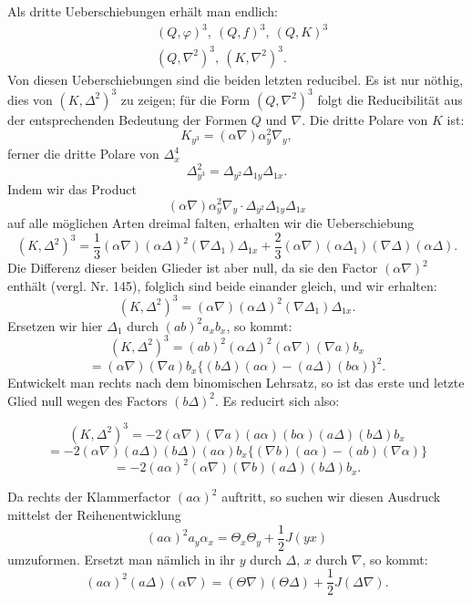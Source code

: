 Als dritte Ueberschiebungen erhält man endlich:
\[
\begin{aligned}
&(Q,\varphi)^3, \ (Q,f)^3, \ (Q,K)^3\\
&(Q,\nabla^2)^3, \ (K,\nabla^2)^3.
\end{aligned}
\]
Von diesen Ueberschiebungen sind die beiden letzten reducibel. Es ist nur
nöthig, dies von $(K,\Delta^2)^3$ zu zeigen; für die Form $(Q,\nabla^2)^3$
folgt die Reducibilität aus der entsprechenden Bedeutung der Formen $Q$
und $\nabla$. Die dritte Polare von $K$ ist:
\[
K_{y^3} = (\alpha\nabla)\alpha_y^2\nabla_y,
\]
ferner die dritte Polare von $\Delta_x^4$
\[
\Delta_{y^3}^2 = \Delta_{y^2}\Delta_{1y}\Delta_{1x}.
\]
Indem wir das Product
\[
(\alpha\nabla)\alpha_y^2\nabla_y\cdot \Delta_{y^2}\Delta_{1y}\Delta_{1x}
\]
auf alle möglichen Arten dreimal falten, erhalten wir die Ueberschiebung
\[
(K,\Delta^2)^3 = \frac{1}{3}(\alpha\nabla)(\alpha\Delta)^2(\nabla\Delta_1)\Delta_{1x} + \frac{2}{3}(\alpha\nabla)(\alpha\Delta_1)(\nabla\Delta)(\alpha\Delta).
\]
Die Differenz dieser beiden Glieder ist aber null, da sie den Factor
$(\alpha\nabla)^2$ enthält (vergl. Nr. 145), folglich sind beide einander
gleich, und wir erhalten:
\[
(K,\Delta^2)^3 = (\alpha\nabla)(\alpha\Delta)^2(\nabla\Delta_1)\Delta_{1x}.
\]
Ersetzen wir hier $\Delta_1$ durch $(ab)^2a_xb_x$, so kommt:
\[
(K,\Delta^2)^3 = (ab)^2(\alpha\Delta)^2(\alpha\nabla)(\nabla a)b_x
\]
\[
= (\alpha\nabla)(\nabla a)b_x\{(b\Delta)(a\alpha) - (a\Delta)(b\alpha)\}^2.
\]
Entwickelt man rechts nach dem binomischen Lehrsatz, so ist das erste und
letzte Glied null wegen des Factors $(b\Delta)^2$. Es reducirt sich also:



\[
(K, \Delta^2)^3 = -2(\alpha\nabla)(\nabla a)(a\alpha)(b\alpha)(a\Delta)(b\Delta)b_x
\]
\[
= -2(\alpha\nabla)(a\Delta)(b\Delta)(a\alpha)b_x\{(\nabla b)(a\alpha)-(ab)(\nabla\alpha)\}
\]
\[
= -2(a\alpha)^2(\alpha\nabla)(\nabla b)(a\Delta)(b\Delta)b_x.
\]

Da rechts der Klammerfactor $(a\alpha)^2$ auftritt, so suchen wir diesen
Ausdruck mittelst der Reihenentwicklung
\[
(a\alpha)^2 a_y\alpha_x = \Theta_x\Theta_y + \frac{1}{2}J(yx)
\]
umzuformen. Ersetzt man nämlich in ihr $y$ durch $\Delta$, $x$ durch $\nabla$,
so kommt:
\[
(a\alpha)^2(a\Delta)(\alpha\nabla) = (\Theta\nabla)(\Theta\Delta) + \frac{1}{2}J(\Delta\nabla).
\]

